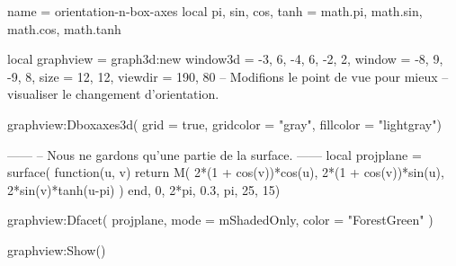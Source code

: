 \documentclass{standalone}
\begin{document}
\begin{luadraw}{name = orientation-n-box-axes}
local pi, sin, cos, tanh = math.pi, math.sin, math.cos, math.tanh

local graphview = graph3d:new{
  window3d = {-3, 6, -4, 6, -2, 2},
  window   = {-8, 9, -9, 8},
  size     = {12, 12},
  viewdir  = {190, 80}  -- Modifions le point de vue pour mieux
                        -- visualiser le changement d'orientation.
}

graphview:Dboxaxes3d({
  grid      = true,
  gridcolor = "gray",
  fillcolor = "lightgray"})

------
-- Nous ne gardons qu'une partie de la surface.
------
local projplane = surface(
  function(u, v)
    return M(
      2*(1 + cos(v))*cos(u),
      2*(1 + cos(v))*sin(u),
      2*sin(v)*tanh(u-pi)
    )
  end,
  0, 2*pi, 0.3, pi,
  {25, 15})

graphview:Dfacet(
  projplane,
  {
    mode  = mShadedOnly,
    color = "ForestGreen"
  })

graphview:Show()
\end{luadraw}
\end{document}
